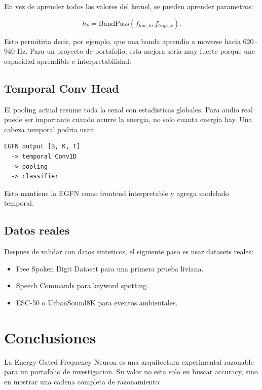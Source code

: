 \documentclass[11pt,letterpaper]{article}
\begin{document}
En vez de aprender todos los valores del kernel, se pueden aprender parametros:

\begin{equation}
    h_k = \text{BandPass}(f_{low,k}, f_{high,k}).
\end{equation}

Esto permitiria decir, por ejemplo, que una banda aprendio a moverse hacia
620--940 Hz. Para un proyecto de portafolio, esta mejora seria muy fuerte
porque une capacidad aprendible e interpretabilidad.

\subsection{Temporal Conv Head}

El pooling actual resume toda la senal con estadisticas globales. Para audio
real puede ser importante cuando ocurre la energia, no solo cuanta energia hay.
Una cabeza temporal podria usar:

\begin{verbatim}
EGFN output [B, K, T]
  -> temporal Conv1D
  -> pooling
  -> classifier
\end{verbatim}

Esto mantiene la EGFN como frontend interpretable y agrega modelado temporal.

\subsection{Datos reales}

Despues de validar con datos sinteticos, el siguiente paso es usar datasets
reales:

\begin{itemize}[leftmargin=*]
    \item Free Spoken Digit Dataset para una primera prueba liviana.
    \item Speech Commands para keyword spotting.
    \item ESC-50 o UrbanSound8K para eventos ambientales.
\end{itemize}

\section{Conclusiones}

La Energy-Gated Frequency Neuron es una arquitectura experimental razonable
para un portafolio de investigacion. Su valor no esta solo en buscar accuracy,
sino en mostrar una cadena completa de razonamiento:
\end{document}
